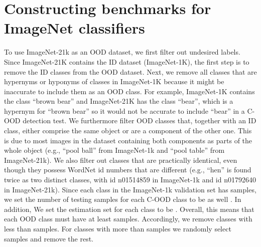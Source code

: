 \documentclass[table]{article} \usepackage{PRIMEarxiv}
\begin{document}
\section{Constructing benchmarks for ImageNet classifiers}
\label{sec:imagenet_benchmark}
To use ImageNet-21k as an OOD dataset, we first filter out undesired labels.
Since ImageNet-21K contains the ID dataset (ImageNet-1K), the first step is to remove the ID classes from the OOD dataset. Next, we remove all classes that are hypernyms or hyponyms of classes in ImageNet-1K because it might be inaccurate to include them as an OOD class. For example, ImageNet-1K contains the class ``brown bear'' and ImageNet-21K has the class ``bear'', which is a hypernym for ``brown bear'' so it would not be accurate to include ``bear'' in a C-OOD detection test. 
We furthermore filter OOD classes that, together with an ID class, either comprise the same object or are a component of the other one. This is due to most images in the dataset containing both components as parts of the whole object (e.g., ``pool ball'' from ImageNet-1k and ``pool table'' from ImageNet-21k).
We also filter out classes that are practically identical, even though they possess WordNet id numbers that are different (e.g., ``hen'' is found twice as two distinct classes, with id n01514859 in ImageNet-1k and id n01792640 in ImageNet-21k).
Since each class in the ImageNet-1k validation set has  samples, we set the number of testing samples for each C-OOD class to be  as well . In addition, We set the estimation set for each class to be  . Overall, this means that each OOD class must have at least  samples. 
Accordingly, we remove classes with less than  samples. For classes with more than  samples we randomly select  samples and remove the rest.
\end{document}
